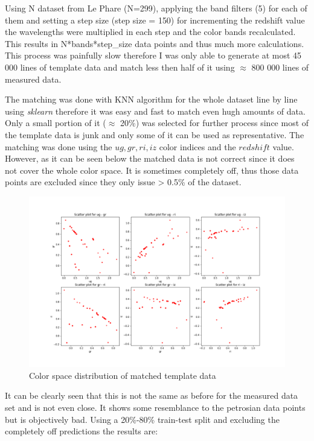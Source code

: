 \documentclass[a4paper,12pt]{article}
\begin{document}
\par Using N dataset from Le Phare (N=299), applying the band filters (5)
for each of them and setting a step size (step size = 150) for incrementing
the redshift value the wavelengths were multiplied in each step and the color 
bands recalculated. This results in N*bands*step\_size data points and thus much
more calculations. This process was painfully slow therefore I was only able 
to generate at most 45 000 lines of template data and match less then half of it
using $\approx$ 800 000 lines of measured data.

\par The matching was done with KNN algorithm for the whole dataset line by 
line using \textit{sklearn} therefore it was easy and fast to match even
hugh amounts of data. Only a small portion of it ($\approx$ 20\%) was selected for further process
since most of the template data is junk and only some of it can be used as 
representative. The matching was done using the $ug, gr, ri, iz$ color indices and
the $redshift$ value. However, as it can be seen below the matched data is not correct
since it does not cover the whole color space. It is sometimes completely off, thus
those data points are excluded since they only issue > 0.5\% of the dataset.

\begin{figure}[H]
	\centering
	\includegraphics[width=.86\textwidth]{./colorspace.png}
	\caption{ Color space distribution of matched template data }
\end{figure}

\par It can be clearly seen that this is not the same as before 
for the measured data set and is not even close. It shows some 
resemblance to the petrosian data points but is objectively bad.
Using a 20\%-80\% train-test split and excluding the completely off
predictions the results are:
\end{document}
